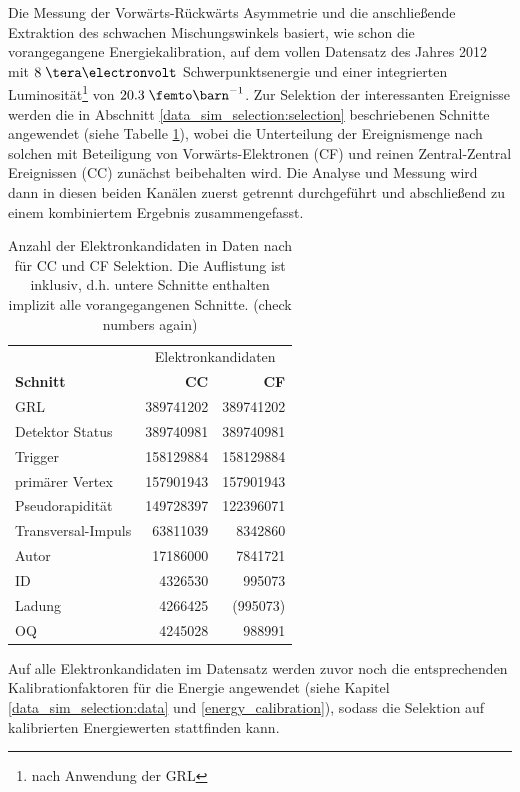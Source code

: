 Die Messung der Vorwärts-Rückwärts Asymmetrie und die anschließende Extraktion
des schwachen Mischungswinkels basiert, wie schon die vorangegangene
Energiekalibration, auf dem vollen Datensatz des Jahres 2012 mit $8\TeV$
Schwerpunktsenergie und einer integrierten Luminosität\footnote{nach Anwendung
der \ac{GRL}} von $20.3\fb^{-1}$. Zur Selektion der interessanten Ereignisse
werden die in Abschnitt \ref{data_sim_selection:selection} beschriebenen
Schnitte angewendet (siehe Tabelle \ref{tab:data_selection}), wobei die
Unterteilung der Ereignismenge nach solchen mit Beteiligung von
Vorwärts-Elektronen (CF) und reinen Zentral-Zentral Ereignissen (CC) zunächst
beibehalten wird. Die Analyse und Messung wird dann in diesen beiden Kanälen
zuerst getrennt durchgeführt und abschließend zu einem kombiniertem Ergebnis
zusammengefasst.
\begin{table} [h]
    \centering
    \begin{tabular}{|l|r|r|}
        \hline
        & \multicolumn{2}{|c|}{Elektronkandidaten}   \\
        \textbf{Schnitt} & \textbf{CC} & \textbf{CF} \\  %
        \hline\hline
        \ac{GRL}           & 389741202 & 389741202   \\  %
        Detektor Status    & 389740981 & 389740981   \\  %
        Trigger            & 158129884 & 158129884   \\  %
        primärer Vertex    & 157901943 & 157901943   \\  %
        Pseudorapidität    & 149728397 & 122396071   \\  %
        Transversal-Impuls &  63811039 &   8342860   \\  %
        Autor              &  17186000 &   7841721   \\  %
        ID                 &   4326530 &    995073   \\  %
        Ladung             &   4266425 &  (995073)   \\  %
        OQ                 &   4245028 &    988991   \\  %
        \hline
    \end{tabular}
    \caption[Anzahl der Elektronkandidaten in Daten für CC und CF Selektion]
        {Anzahl der Elektronkandidaten in Daten nach für CC und CF Selektion.
        Die Auflistung ist inklusiv, d.h. untere Schnitte enthalten implizit
        alle vorangegangenen Schnitte. (\development check numbers again)}
    \label{tab:data_selection}
\end{table}
Auf alle Elektronkandidaten im Datensatz werden zuvor noch die entsprechenden
Kalibrationfaktoren für die Energie angewendet (siehe Kapitel
\ref{data_sim_selection:data} und \ref{energy_calibration}), sodass die
Selektion auf kalibrierten Energiewerten stattfinden kann.


